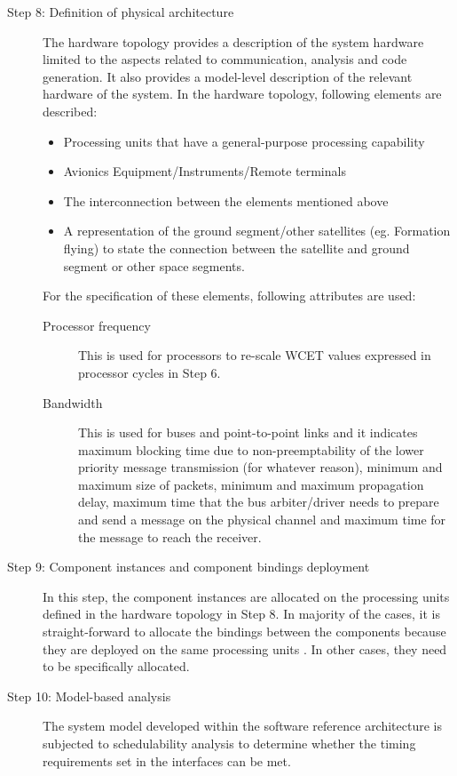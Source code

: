 \begin{description}
\item [Step 8: Definition of physical architecture] The hardware topology provides a description of the system hardware limited to the aspects related to communication, analysis and code generation. It also provides a model-level description of the relevant hardware of the system. In the hardware topology, following elements are described:
\begin{itemize}
\item Processing units that have a general-purpose processing capability
\item Avionics Equipment/Instruments/Remote terminals
\item The interconnection between the elements mentioned above 
\item A representation of the ground segment/other satellites (eg. Formation flying) to state the connection between the satellite and ground segment or other space segments.
\end{itemize}		
For the specification of these elements, following attributes are used:
\begin{description}
\item [Processor frequency] This is used for processors to re-scale WCET values expressed in processor cycles in Step 6.
\item [Bandwidth] This is used for buses and point-to-point links and it indicates maximum blocking time due to non-preemptability of the lower priority message transmission (for whatever reason), minimum and maximum size of packets, minimum and maximum propagation delay, maximum time that the bus arbiter/driver needs to prepare and send a message on the physical channel and maximum time for the message to reach the receiver.    
\end{description}

\item [Step 9: Component instances and component bindings deployment] In this step, the component instances are allocated on the processing units defined in the hardware topology in Step 8. In majority of the cases, it is straight-forward to allocate the bindings between the components because they are deployed on the same processing units \cite{CompBasedProcess}. In other cases, they need to be specifically allocated.

\item [Step 10: Model-based analysis] The system model developed within the software reference architecture is subjected to schedulability analysis to determine whether the timing requirements set in the interfaces can be met.


\end{description}

